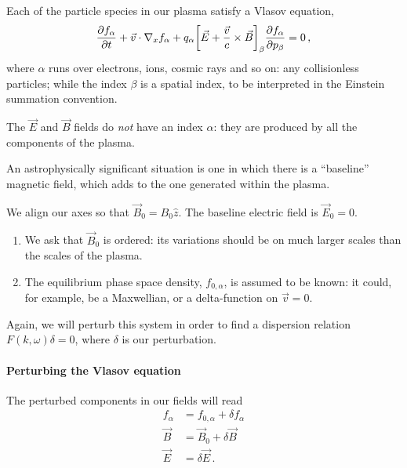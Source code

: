 \documentclass[main.tex]{subfiles}
\begin{document}

Each of the particle species in our plasma satisfy a Vlasov equation, 
%
\begin{align}
\pdv{f_\alpha }{t} + \vec{v} \cdot \nabla_x f_\alpha + q_\alpha \qty[ \vec{E} + \frac{\vec{v}}{c} \times \vec{B}]_\beta  \pdv{f_\alpha }{p_\beta } = 0
\,,
\end{align}
%
where \(\alpha \) runs over electrons, ions, cosmic rays and so on: any collisionless particles; while the index \(\beta \) is a spatial index, to be interpreted in the Einstein summation convention.

The \(\vec{E}\) and \(\vec{B}\) fields do \emph{not} have an index \(\alpha\): they are produced by all the components of the plasma. 

An astrophysically significant situation is one in which there is a ``baseline'' magnetic field, which adds to the one generated within the plasma. 

We align our axes so that \(\vec{B}_0 = B_0  \hat{z}\). 
The baseline electric field is \(\vec{E}_0 = 0\). 

\begin{enumerate}
    \item We ask that \(\vec{B}_0\) is ordered: its variations should be on much larger scales than the scales of the plasma. 
    \item The equilibrium phase space density, \(f_{0, \alpha }\), is assumed to be known: it could, for example, be a Maxwellian, or a delta-function on \(\vec{v} = 0\). 
\end{enumerate}

Again, we will perturb this system in order to find a dispersion relation \(F(k, \omega ) \delta = 0\), where \(\delta \) is our perturbation.

\paragraph{Perturbing the Vlasov equation}

The perturbed components in our fields will read 
%
\begin{align}
f_\alpha &= f_{0, \alpha } + \delta f_\alpha  \\
\vec{B} &= \vec{B}_0 + \delta \vec{B}  \\
\vec{E} &= \delta \vec{E}
\,.
\end{align}
\end{document}
